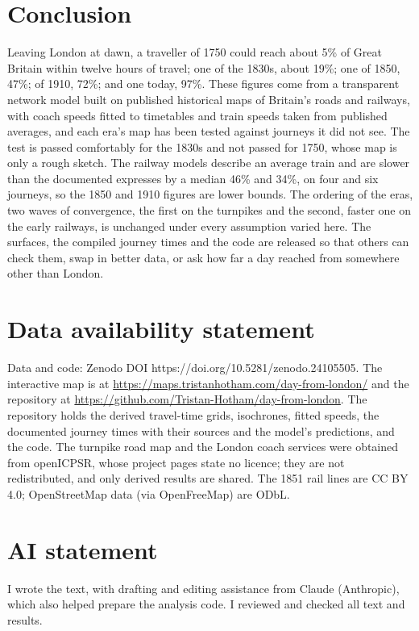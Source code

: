 \documentclass[11pt,a4paper]{article}
\begin{document}
\section{Conclusion}\label{sec:conc}
Leaving London at dawn, a traveller of 1750 could reach about 5\% of Great Britain within twelve hours of travel; one of the 1830s, about 19\%; one of 1850, 47\%; of 1910, 72\%; and one today, 97\%. These figures come from a transparent network model built on published historical maps of Britain's roads and railways, with coach speeds fitted to timetables and train speeds taken from published averages, and each era's map has been tested against journeys it did not see. The test is passed comfortably for the 1830s and not passed for 1750, whose map is only a rough sketch. The railway models describe an average train and are slower than the documented expresses by a median 46\% and 34\%, on four and six journeys, so the 1850 and 1910 figures are lower bounds. The ordering of the eras, two waves of convergence, the first on the turnpikes and the second, faster one on the early railways, is unchanged under every assumption varied here. The surfaces, the compiled journey times and the code are released so that others can check them, swap in better data, or ask how far a day reached from somewhere other than London.



\section*{Data availability statement}
Data and code: Zenodo DOI https://doi.org/10.5281/zenodo.24105505. The interactive map is at \url{https://maps.tristanhotham.com/day-from-london/} and the repository at \url{https://github.com/Tristan-Hotham/day-from-london}. The repository holds the derived travel-time grids, isochrones, fitted speeds, the documented journey times with their sources and the model's predictions, and the code. The turnpike road map and the London coach services \citep{rosevear2023tp,rosevear2023coach} were obtained from openICPSR, whose project pages state no licence; they are not redistributed, and only derived results are shared. The 1851 rail lines \citep{satchell2023} are CC BY 4.0; OpenStreetMap data (via OpenFreeMap) are ODbL.

\section*{AI statement}
I wrote the text, with drafting and editing assistance from Claude (Anthropic), which also helped prepare the analysis code. I reviewed and checked all text and results.
\end{document}
